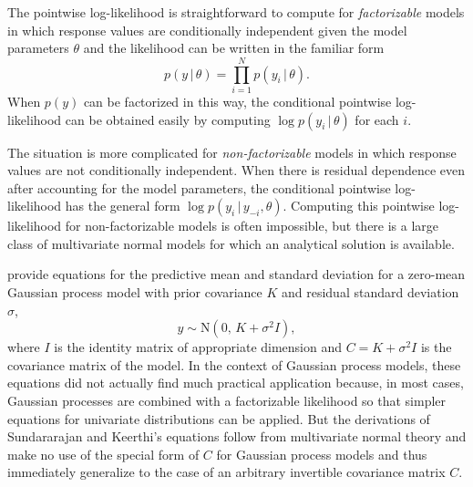 \documentclass[11pt]{article}
\begin{document}
The pointwise log-likelihood is straightforward to compute for
\emph{factorizable} models in which response values are conditionally
independent given the model parameters $\theta$ and the likelihood can be
written in the familiar form
%
\begin{equation}
p(y \,|\, \theta) = \prod_{i=1}^N p(y_i \,|\, \theta).
\end{equation}
%
When $p(y)$ can be factorized in this way, the conditional pointwise
log-likelihood can be obtained easily by computing $\log p(y_i \,|\, \theta)$
for each $i$.

The situation is more complicated for \emph{non-factorizable} models in which
response values are not conditionally independent. When there is residual
dependence even after accounting for the model parameters, the conditional
pointwise log-likelihood has the general form $\log p(y_i \,|\, y_{-i},
\theta)$. Computing this pointwise log-likelihood for non-factorizable models is 
often impossible, but there is a large class of multivariate normal models for which 
an analytical solution is available.

\cite{sundararajan2001} provide equations for the predictive mean and standard
deviation for a zero-mean Gaussian process model with prior covariance $K$ and
residual standard deviation $\sigma$,
%
\begin{equation}
\label{gp}
y \sim {\mathrm N}(0, \, K+\sigma^2 I),
\end{equation}
%
where $I$ is the identity matrix of appropriate dimension and $C = K+\sigma^2 I$
is the covariance matrix of the model. In the context of Gaussian process models, 
these equations did not actually find much practical application because, in most
cases, Gaussian processes are combined with a factorizable likelihood so that
simpler equations for univariate distributions can be applied. But the
derivations of Sundararajan and Keerthi's equations follow from multivariate 
normal theory and make no use of the special
form of $C$ for Gaussian process models and thus immediately generalize to the
case of an arbitrary invertible covariance matrix $C$.
\end{document}
